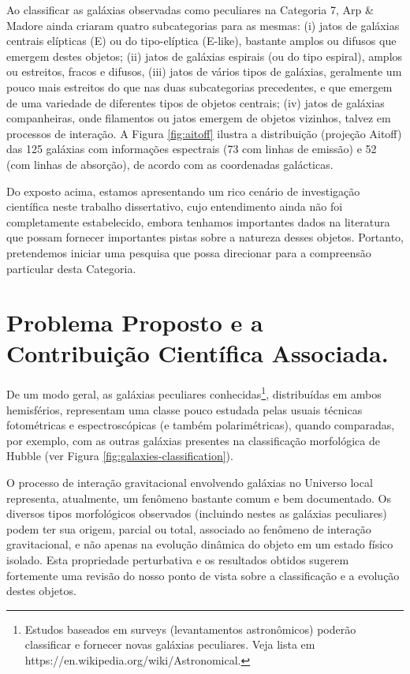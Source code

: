 Ao classificar as galáxias observadas como peculiares na Categoria 7, Arp \& Madore ainda criaram quatro subcategorias para as mesmas: (i) jatos de galáxias centrais elípticas (E) ou do tipo-elíptica (E-like), bastante amplos ou difusos que emergem destes objetos; (ii) jatos de galáxias espirais (ou do tipo espiral), amplos ou estreitos, fracos e difusos, (iii) jatos de vários tipos de galáxias, geralmente um pouco mais estreitos do que nas duas subcategorias precedentes, e que emergem de uma variedade de diferentes tipos de objetos centrais; (iv) jatos de galáxias companheiras, onde filamentos ou jatos emergem de objetos vizinhos, talvez em processos de interação. A Figura \ref{fig:aitoff} ilustra a distribuição (projeção Aitoff) das 125 galáxias com informações espectrais (73 com linhas de emissão) e 52 (com linhas de absorção), de acordo com as coordenadas galácticas.

Do exposto acima, estamos apresentando um rico cenário de investigação científica neste trabalho dissertativo, cujo entendimento ainda não foi completamente estabelecido, embora tenhamos importantes dados na literatura que possam fornecer importantes pistas sobre a natureza desses objetos. Portanto, pretendemos iniciar uma pesquisa que possa direcionar para a compreensão particular desta Categoria. 

\section{Problema Proposto e a Contribuição Científica Associada.}

De um modo geral, as galáxias peculiares conhecidas\footnote{Estudos baseados em surveys (levantamentos astronômicos) poderão classificar e fornecer novas galáxias peculiares. Veja lista em https://en.wikipedia.org/wiki/Astronomical.}, distribuídas em ambos hemisférios, representam uma classe pouco estudada pelas usuais técnicas fotométricas e espectroscópicas (e também polarimétricas), quando comparadas, por exemplo, com as outras galáxias presentes na classificação morfológica de Hubble (ver Figura \ref{fig:galaxies-classification}).

O processo de interação gravitacional envolvendo galáxias no Universo local representa, atualmente, um fenômeno bastante comum e bem documentado. Os diversos tipos morfológicos observados (incluindo nestes as galáxias peculiares) podem ter sua origem, parcial ou total, associado ao fenômeno de interação gravitacional, e não apenas na evolução dinâmica do objeto em um estado físico isolado. Esta propriedade perturbativa e os resultados obtidos sugerem fortemente uma revisão do nosso ponto de vista sobre a classificação e a evolução destes objetos.

